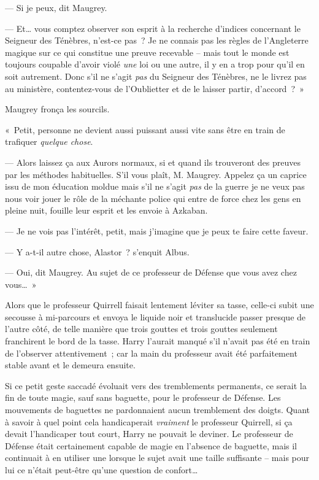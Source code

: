 --- Si je peux, dit Maugrey.

--- Et… vous comptez observer son esprit à la recherche d'indices concernant le Seigneur des Ténèbres, n'est-ce pas~? Je ne connais pas les règles de l'Angleterre magique sur ce qui constitue une preuve recevable -- mais tout le monde est toujours coupable d'avoir violé \emph{une} loi ou une autre, il y en a trop pour qu'il en soit autrement. Donc s'il ne s'agit \emph{pas} du Seigneur des Ténèbres, ne le livrez pas au ministère, contentez-vous de l'Oublietter et de le laisser partir, d'accord~?~»

Maugrey fronça les sourcils.

«~Petit, personne ne devient aussi puissant aussi vite sans être en train de trafiquer \emph{quelque chose}.

--- Alors laissez ça aux Aurors normaux, si et quand ils trouveront des preuves par les méthodes habituelles. S'il vous plaît, M. Maugrey. Appelez ça un caprice issu de mon éducation moldue mais s'il ne s'agit \emph{pas} de la guerre je ne veux pas nous voir jouer le rôle de la méchante police qui entre de force chez les gens en pleine nuit, fouille leur esprit et les envoie à Azkaban.

--- Je ne vois pas l'intérêt, petit, mais j'imagine que je peux te faire cette faveur.

--- Y a-t-il autre chose, Alastor~? s'enquit Albus.

--- Oui, dit Maugrey. Au sujet de ce professeur de Défense que vous avez chez vous…~»



Alors que le professeur Quirrell faisait lentement léviter sa tasse, celle-ci subit une secousse à mi-parcours et envoya le liquide noir et translucide passer presque de l'autre côté, de telle manière que trois gouttes et trois gouttes seulement franchirent le bord de la tasse. Harry l'aurait manqué s'il n'avait pas été en train de l'observer attentivement~; car la main du professeur avait été parfaitement stable avant et le demeura ensuite.

Si ce petit geste saccadé évoluait vers des tremblements permanents, ce serait la fin de toute magie, sauf sans baguette, pour le professeur de Défense. Les mouvements de baguettes ne pardonnaient aucun tremblement des doigts. Quant à savoir à quel point cela handicaperait \emph{vraiment} le professeur Quirrell, si ça devait l'handicaper tout court, Harry ne pouvait le deviner. Le professeur de Défense était certainement capable de magie en l'absence de baguette, mais il continuait à en utiliser une lorsque le sujet avait une taille suffisante -- mais pour lui ce n'était peut-être qu'une question de confort…

